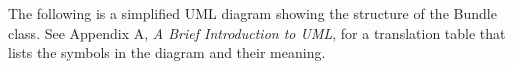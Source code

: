 
\pagebreak


The following is a simplified UML diagram showing the structure of the
Bundle class.  See Appendix A, {\it A Brief Introduction to UML},
for a translation table that lists the symbols in the diagram and their 
meaning.

